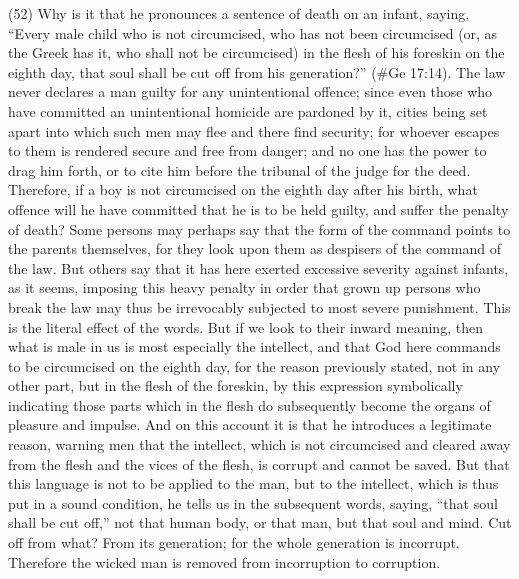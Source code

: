 (52) Why is it that he pronounces a sentence of death on an infant, saying, ``Every male child who
is not circumcised, who has not been circumcised (or, as the Greek has it, who shall not be
circumcised) in the flesh of his foreskin on the eighth day, that soul shall be cut off from his
generation?'' (\#Ge 17:14). The law never declares a man guilty for any unintentional offence;
since even those who have committed an unintentional homicide are pardoned by it, cities being
set apart into which such men may flee and there find security; for whoever escapes to them is
rendered secure and free from danger; and no one has the power to drag him forth, or to cite him
before the tribunal of the judge for the deed. Therefore, if a boy is not circumcised on the eighth
day after his birth, what offence will he have committed that he is to be held guilty, and suffer the
penalty of death? Some persons may perhaps say that the form of the command points to the
parents themselves, for they look upon them as despisers of the command of the law. But others
say that it has here exerted excessive severity against infants, as it seems, imposing this heavy
penalty in order that grown up persons who break the law may thus be irrevocably subjected to
most severe punishment. This is the literal effect of the words. But if we look to their inward
meaning, then what is male in us is most especially the intellect, and that God here commands to
be circumcised on the eighth day, for the reason previously stated, not in any other part, but in the
flesh of the foreskin, by this expression symbolically indicating those parts which in the flesh do
subsequently become the organs of pleasure and impulse. And on this account it is that he
introduces a legitimate reason, warning men that the intellect, which is not circumcised and cleared
away from the flesh and the vices of the flesh, is corrupt and cannot be saved. But that this
language is not to be applied to the man, but to the intellect, which is thus put in a sound condition,
he tells us in the subsequent words, saying, ``that soul shall be cut off,'' not that human body, or that
man, but that soul and mind. Cut off from what? From its generation; for the whole generation is
incorrupt. Therefore the wicked man is removed from incorruption to corruption.

